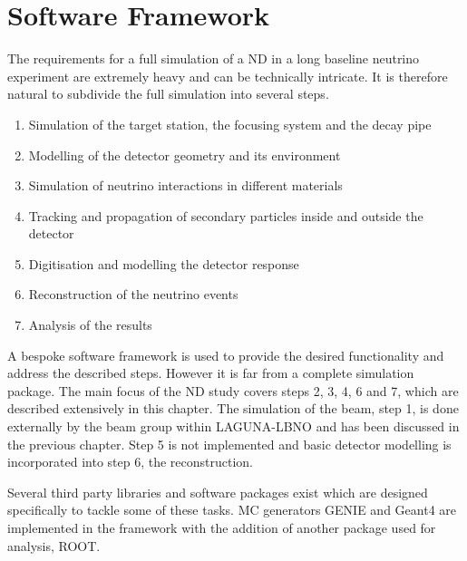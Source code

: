 \section{Software Framework}
The requirements for a full simulation of a ND in a long baseline neutrino experiment are extremely heavy and can be technically intricate. It is therefore natural to subdivide the full simulation into several steps.
\begin{enumerate}
 \item Simulation of the target station, the focusing system and the decay pipe
 \item Modelling of the detector geometry and its environment
 \item Simulation of neutrino interactions in different materials
 \item Tracking and propagation of secondary particles inside and outside the detector
 \item Digitisation and modelling the detector response
 \item Reconstruction of the neutrino events
 \item Analysis of the results
\end{enumerate}

A bespoke software framework is used to provide the desired functionality and address the described steps. However it is far from a complete simulation package. The main focus of the ND study covers steps 2, 3, 4, 6 and 7, which are described extensively in this chapter. The simulation of the beam, step 1, is done externally by the beam group within LAGUNA-LBNO and has been discussed in the previous chapter. Step 5 is not implemented and basic detector modelling is incorporated into step 6, the reconstruction. 

Several third party libraries and software packages exist which are designed specifically to tackle some of these tasks. MC generators GENIE and Geant4 are implemented in the framework with the addition of another package used for analysis, ROOT\cite{ROOT}.

